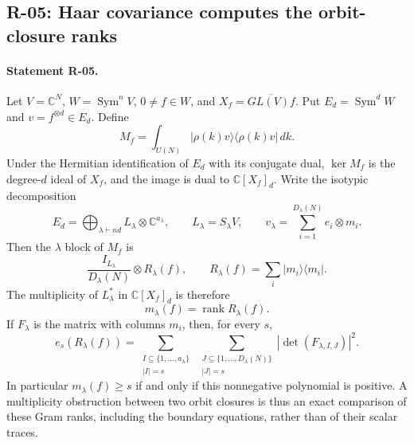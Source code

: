 \documentclass[11pt,a4paper]{article}
\theoremstyle{definition}\newtheorem{definition}{Definition}
\begin{document}
\subsection{R-05: Haar covariance computes the orbit-closure ranks}

\paragraph{Statement R-05.}
Let $V=\mathbb C^N$, $W=\operatorname{Sym}^nV$, $0\ne f\in W$, and
$X_f=\overline{GL(V)f}$. Put $E_d=\operatorname{Sym}^dW$ and
$v=f^{\otimes d}\in E_d$. Define
\begin{equation}\label{R05:twirl}
 M_f=\int_{U(N)}|\rho(k)v\rangle\langle\rho(k)v|\,dk.
\end{equation}
Under the Hermitian identification of $E_d$ with its conjugate dual,
$\ker M_f$ is the degree-$d$ ideal of $X_f$, and the image is dual to
$\mathbb C[X_f]_d$. Write the isotypic decomposition
\[
 E_d=\bigoplus_{\lambda\vdash nd} L_\lambda\otimes\mathbb C^{a_\lambda},
 \qquad L_\lambda=S_\lambda V,
 \qquad v_\lambda=\sum_{i=1}^{D_\lambda(N)}e_i\otimes m_i.
\]
Then the $\lambda$ block of $M_f$ is
\begin{equation}\label{R05:block}
 \frac{I_{L_\lambda}}{D_\lambda(N)}\otimes R_\lambda(f),
 \qquad R_\lambda(f)=\sum_i|m_i\rangle\langle m_i|.
\end{equation}
The multiplicity of $L_\lambda^*$ in $\mathbb C[X_f]_d$ is therefore
\begin{equation}\label{R05:rank}
 m_\lambda(f)=\operatorname{rank}R_\lambda(f).
\end{equation}
If $F_\lambda$ is the matrix with columns $m_i$, then, for every $s$,
\begin{equation}\label{R05:minors}
 e_s(R_\lambda(f))=
 \sum_{\substack{I\subseteq\{1,\ldots,a_\lambda\}\\|I|=s}}
 \ \sum_{\substack{J\subseteq\{1,\ldots,D_\lambda(N)\}\\|J|=s}}
       |\det(F_{\lambda,I,J})|^2.
\end{equation}
In particular $m_\lambda(f)\geq s$ if and only if this nonnegative
polynomial is positive. A multiplicity obstruction between two orbit
closures is thus an exact comparison of these Gram ranks, including
the boundary equations, rather than of their scalar traces.
\end{document}
